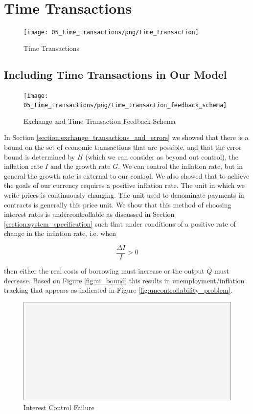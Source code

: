 \section{Time Transactions}
\label{section:time_transactions}

\begin{figure}[H]
\centering
\texttt{[image: 05\_time\_transactions/png/time\_transaction]}
\caption{Time Transactions}
\label{fig:time_transactions2}
\end{figure}

\subsection{Including Time Transactions in Our Model}

\begin{figure}[H]
\centering
\texttt{[image: 05\_time\_transactions/png/time\_transaction\_feedback\_schema]}
\caption{Exchange and Time Transaction Feedback Schema}
\label{fig:exchange_and_time_transaction_schema1}
\end{figure}

In Section \ref{section:exchange_transactions_and_errors} we showed that there is a bound on the set of
economic transactions that are possible, and that the error bound is determined by $H$ (which we can
consider as beyond out control), the inflation rate $I$ and the growth rate $G$. We can control the
inflation rate, but in general the growth rate is external to our control. We also showed that to
achieve the goals of our currency requires a positive inflation rate. The unit in which we write
prices is continuously changing. The unit used to denominate payments in contracts is generally this
price unit. We show that this method of choosing interest rates is undercontrollable as discussed in
Section \ref{section:system_specification} such that under conditions of a positive rate of change
in the inflation rate, i.e. when

\[
    \frac {\Delta I} I > 0
\]

then either the real costs of borrowing must increase or the output $Q$ must decrease. Based on   
Figure \ref{fig:ui_bound} this results in unemployment/inflation tracking that appears as indicated
in Figure \ref{fig:uncontrollability_problem}.

\begin{figure}[H]
\centering
\includegraphics[scale=0.48]{blank}
\caption{Interest Control Failure}
\label{fig:interest_control_failure}
\end{figure}

